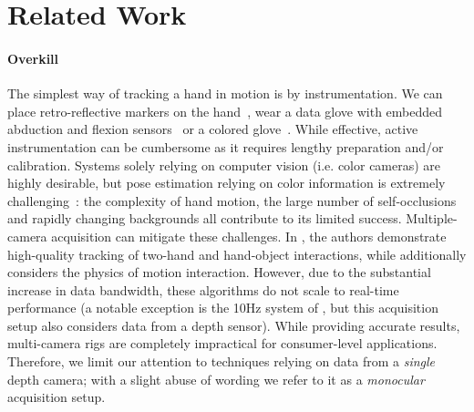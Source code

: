 


% 
\section{Related Work}
\label{sec:related}
\paragraph{Overkill} %
The simplest way of tracking a hand in motion is by instrumentation. We can place retro-reflective markers on the hand~\cite{zhao2012marker}, wear a data glove with embedded abduction and flexion sensors~\cite{dipietro2008survey} or a colored glove~\cite{wang2009colorglove}. While effective, active instrumentation can be cumbersome as it requires lengthy preparation and/or calibration. Systems solely relying on computer vision (i.e. color cameras) are highly desirable, but pose estimation  relying on color information is extremely challenging~\cite{erol2007survey}: the complexity of hand motion, the large number of self-occlusions and rapidly changing backgrounds all contribute to its limited success. Multiple-camera acquisition can mitigate these challenges. In \cite{ballan2013salient}, the authors demonstrate high-quality tracking of two-hand and hand-object interactions, while \cite{wang2013physics} additionally considers the physics of motion interaction. However, due to the substantial increase in data bandwidth, these algorithms do not scale to real-time performance (a notable exception is the 10Hz system of  \cite{sridhar2013multicam}, but this acquisition setup also considers data from a depth sensor). While providing accurate results, multi-camera rigs are completely impractical for consumer-level applications. Therefore, we limit our attention to techniques relying on data from a \emph{single} depth camera; with a slight abuse of wording we refer to it as a \emph{monocular} acquisition setup.


